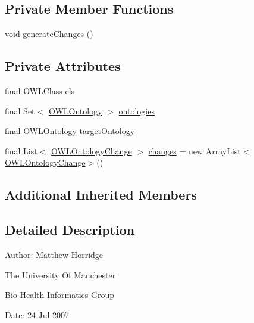 \subsection*{Private Member Functions}
\begin{DoxyCompactItemize}
\item 
void \hyperlink{classorg_1_1semanticweb_1_1owlapi_1_1_add_class_expression_closure_axiom_a829921655155cdf323769b286033c506}{generate\-Changes} ()
\end{DoxyCompactItemize}
\subsection*{Private Attributes}
\begin{DoxyCompactItemize}
\item 
final \hyperlink{interfaceorg_1_1semanticweb_1_1owlapi_1_1model_1_1_o_w_l_class}{O\-W\-L\-Class} \hyperlink{classorg_1_1semanticweb_1_1owlapi_1_1_add_class_expression_closure_axiom_a5cec1d39c2c4f63bcb62a259e9b03163}{cls}
\item 
final Set$<$ \hyperlink{interfaceorg_1_1semanticweb_1_1owlapi_1_1model_1_1_o_w_l_ontology}{O\-W\-L\-Ontology} $>$ \hyperlink{classorg_1_1semanticweb_1_1owlapi_1_1_add_class_expression_closure_axiom_ab96f29d5961bedbb82a9255de0c01b5e}{ontologies}
\item 
final \hyperlink{interfaceorg_1_1semanticweb_1_1owlapi_1_1model_1_1_o_w_l_ontology}{O\-W\-L\-Ontology} \hyperlink{classorg_1_1semanticweb_1_1owlapi_1_1_add_class_expression_closure_axiom_a1b4cd911a872415e0a76a25714595470}{target\-Ontology}
\item 
final List$<$ \hyperlink{classorg_1_1semanticweb_1_1owlapi_1_1model_1_1_o_w_l_ontology_change}{O\-W\-L\-Ontology\-Change} $>$ \hyperlink{classorg_1_1semanticweb_1_1owlapi_1_1_add_class_expression_closure_axiom_a7bb7bb024c943d8eb0bdad8284ec0af5}{changes} = new Array\-List$<$\hyperlink{classorg_1_1semanticweb_1_1owlapi_1_1model_1_1_o_w_l_ontology_change}{O\-W\-L\-Ontology\-Change}$>$()
\end{DoxyCompactItemize}
\subsection*{Additional Inherited Members}


\subsection{Detailed Description}
Author\-: Matthew Horridge\par
 The University Of Manchester\par
 Bio-\/\-Health Informatics Group\par
 Date\-: 24-\/\-Jul-\/2007\par
 \par
 

